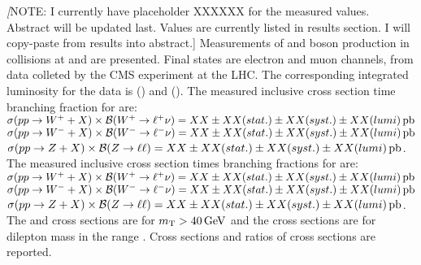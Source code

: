 % 
% 
%

\textit[NOTE: I currently have placeholder XXXXXX for the measured values. Abstract will be updated last. Values are currently listed in results section. I will copy-paste from results into abstract.]
Measurements of \W and \Z boson production in \pp collisions at \sg and \sh are presented. Final states are electron and muon channels, from data colleted by the CMS experiment at the LHC. The corresponding integrated luminosity for the data is \lumig (\sg) and \lumih (\sh). The measured inclusive cross section time branching fraction for \sg are: \\
$\sigma(pp\to W^++X)\times\mathcal{B}(W^+\to \ell^+ \nu) = XX \pm XX (stat.) \pm XX (syst.) \pm XX (lumi) \,\mathrm{pb}$
$\sigma(pp\to W^-+X)\times\mathcal{B}(W^-\to \ell^- \nu) = XX \pm XX (stat.) \pm XX (syst.) \pm XX (lumi) \,\mathrm{pb}$
$\sigma(pp\to Z+X)\times\mathcal{B}(Z\to \ell \ell) = XX \pm XX (stat.) \pm XX (syst.) \pm XX (lumi) \,\mathrm{pb}$. \\
The measured inclusive cross section times branching fractions for \sh are:\\
$\sigma(pp\to W^++X)\times\mathcal{B}(W^+\to \ell^+ \nu) = XX \pm XX (stat.) \pm XX (syst.) \pm XX (lumi) \,\mathrm{pb}$
$\sigma(pp\to W^-+X)\times\mathcal{B}(W^-\to \ell^- \nu) = XX \pm XX (stat.) \pm XX (syst.) \pm XX (lumi) \,\mathrm{pb}$
$\sigma(pp\to Z+X)\times\mathcal{B}(Z\to \ell \ell) = XX \pm XX (stat.) \pm XX (syst.) \pm XX (lumi) \,\mathrm{pb}$. \\
The \Wp and \Wm cross sections are for $m_{\mathrm{T}} > 40 \,\text{Ge\hspace{-.08em}V}$ and the \Z cross sections are for dilepton mass in the range \masswindow. Cross sections and ratios of cross sections are reported. 